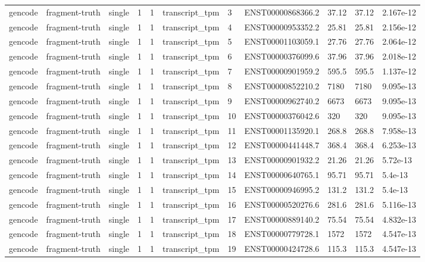 \begin{tabular}{lllllllllll}
gencode & fragment-truth & single & 1 & 1 & transcript\_tpm & 3 & ENST00000868366.2 & 37.12 & 37.12 & 2.167e-12 \\
gencode & fragment-truth & single & 1 & 1 & transcript\_tpm & 4 & ENST00000953352.2 & 25.81 & 25.81 & 2.156e-12 \\
gencode & fragment-truth & single & 1 & 1 & transcript\_tpm & 5 & ENST00001103059.1 & 27.76 & 27.76 & 2.064e-12 \\
gencode & fragment-truth & single & 1 & 1 & transcript\_tpm & 6 & ENST00000376099.6 & 37.96 & 37.96 & 2.018e-12 \\
gencode & fragment-truth & single & 1 & 1 & transcript\_tpm & 7 & ENST00000901959.2 & 595.5 & 595.5 & 1.137e-12 \\
gencode & fragment-truth & single & 1 & 1 & transcript\_tpm & 8 & ENST00000852210.2 & 7180 & 7180 & 9.095e-13 \\
gencode & fragment-truth & single & 1 & 1 & transcript\_tpm & 9 & ENST00000962740.2 & 6673 & 6673 & 9.095e-13 \\
gencode & fragment-truth & single & 1 & 1 & transcript\_tpm & 10 & ENST00000376042.6 & 320 & 320 & 9.095e-13 \\
gencode & fragment-truth & single & 1 & 1 & transcript\_tpm & 11 & ENST00001135920.1 & 268.8 & 268.8 & 7.958e-13 \\
gencode & fragment-truth & single & 1 & 1 & transcript\_tpm & 12 & ENST00000441448.7 & 368.4 & 368.4 & 6.253e-13 \\
gencode & fragment-truth & single & 1 & 1 & transcript\_tpm & 13 & ENST00000901932.2 & 21.26 & 21.26 & 5.72e-13 \\
gencode & fragment-truth & single & 1 & 1 & transcript\_tpm & 14 & ENST00000640765.1 & 95.71 & 95.71 & 5.4e-13 \\
gencode & fragment-truth & single & 1 & 1 & transcript\_tpm & 15 & ENST00000946995.2 & 131.2 & 131.2 & 5.4e-13 \\
gencode & fragment-truth & single & 1 & 1 & transcript\_tpm & 16 & ENST00000520276.6 & 281.6 & 281.6 & 5.116e-13 \\
gencode & fragment-truth & single & 1 & 1 & transcript\_tpm & 17 & ENST00000889140.2 & 75.54 & 75.54 & 4.832e-13 \\
gencode & fragment-truth & single & 1 & 1 & transcript\_tpm & 18 & ENST00000779728.1 & 1572 & 1572 & 4.547e-13 \\
gencode & fragment-truth & single & 1 & 1 & transcript\_tpm & 19 & ENST00000424728.6 & 115.3 & 115.3 & 4.547e-13 \\

\end{tabular}
